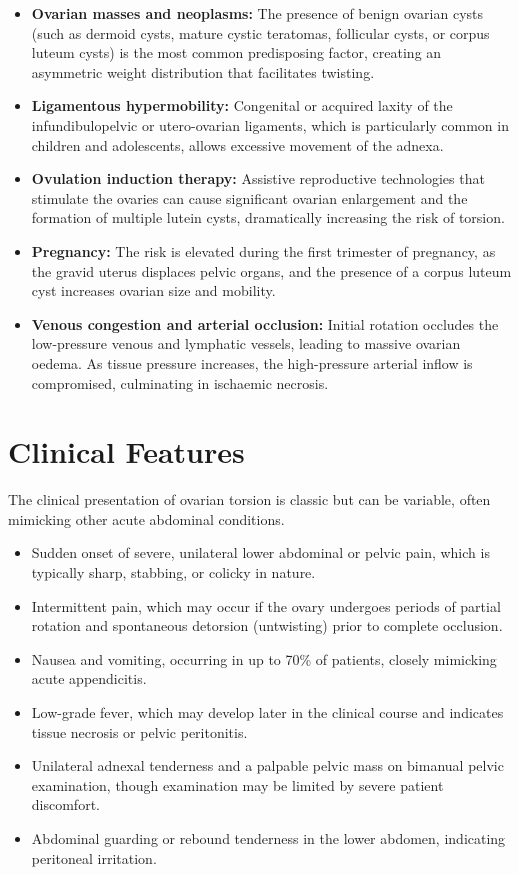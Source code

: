 \begin{itemize}
    \item \textbf{Ovarian masses and neoplasms:} The presence of benign ovarian cysts (such as dermoid cysts, mature cystic teratomas, follicular cysts, or corpus luteum cysts) is the most common predisposing factor, creating an asymmetric weight distribution that facilitates twisting.
    \item \textbf{Ligamentous hypermobility:} Congenital or acquired laxity of the infundibulopelvic or utero-ovarian ligaments, which is particularly common in children and adolescents, allows excessive movement of the adnexa.
    \item \textbf{Ovulation induction therapy:} Assistive reproductive technologies that stimulate the ovaries can cause significant ovarian enlargement and the formation of multiple lutein cysts, dramatically increasing the risk of torsion.
    \item \textbf{Pregnancy:} The risk is elevated during the first trimester of pregnancy, as the gravid uterus displaces pelvic organs, and the presence of a corpus luteum cyst increases ovarian size and mobility.
    \item \textbf{Venous congestion and arterial occlusion:} Initial rotation occludes the low-pressure venous and lymphatic vessels, leading to massive ovarian oedema. As tissue pressure increases, the high-pressure arterial inflow is compromised, culminating in ischaemic necrosis.
\end{itemize}

\section*{Clinical Features}
The clinical presentation of ovarian torsion is classic but can be variable, often mimicking other acute abdominal conditions.

\begin{itemize}
    \item Sudden onset of severe, unilateral lower abdominal or pelvic pain, which is typically sharp, stabbing, or colicky in nature.
    \item Intermittent pain, which may occur if the ovary undergoes periods of partial rotation and spontaneous detorsion (untwisting) prior to complete occlusion.
    \item Nausea and vomiting, occurring in up to 70\% of patients, closely mimicking acute appendicitis.
    \item Low-grade fever, which may develop later in the clinical course and indicates tissue necrosis or pelvic peritonitis.
    \item Unilateral adnexal tenderness and a palpable pelvic mass on bimanual pelvic examination, though examination may be limited by severe patient discomfort.
    \item Abdominal guarding or rebound tenderness in the lower abdomen, indicating peritoneal irritation.
\end{itemize}

